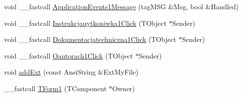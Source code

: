 \begin{CompactItemize}
void \_\-\_\-fastcall \hyperlink{classTForm1_057ec76bdcf16cf01e63de0fe0c7eab1}{ApplicationEvents1Message} (tagMSG \&Msg, bool \&Handled)
\item 
void \_\-\_\-fastcall \hyperlink{classTForm1_4ad666f572df484596275292dfff633a}{Instrukcjauytkoniwka1Click} (TObject $\ast$Sender)
\item 
void \_\-\_\-fastcall \hyperlink{classTForm1_8e6db4f096e5cf3cfc4db6f436d28831}{Dokumentacjatechniczna1Click} (TObject $\ast$Sender)
\item 
void \_\-\_\-fastcall \hyperlink{classTForm1_d6cdb94fa817f5076531e3bf29e4d9ab}{Oautorach1Click} (TObject $\ast$Sender)
\item 
void \hyperlink{classTForm1_579dfded9c383d2fd684e2405dc6371b}{addExt} (const AnsiString \&ExtMyFile)
\item 
\_\-\_\-fastcall \hyperlink{classTForm1_4b77eaf706e8386bc8d79ec547efc8b9}{TForm1} (TComponent $\ast$Owner)
\end{CompactItemize}
